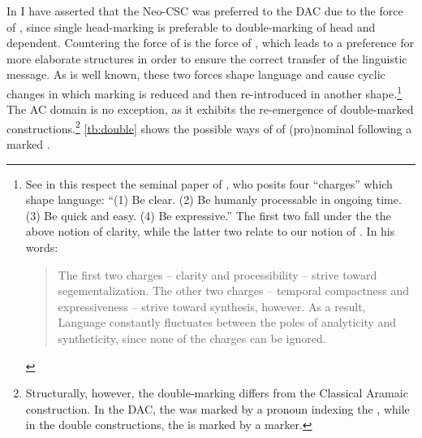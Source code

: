 In  I have asserted that the Neo-CSC was preferred to the DAC due to the force of , since single head-marking is preferable to double-marking of head and dependent. Countering the force of  is the force of , which leads to a preference for more elaborate structures in order to ensure  the correct transfer of the linguistic message.
 As is well known, these two forces shape language and cause cyclic changes in which marking is reduced and then re-introduced in another shape.\footnote{See in this respect the seminal paper of \citet[186]{Slobin1977}, who posits four \enquote{charges} which shape language: \enquote{(1) Be clear. (2) Be humanly processable in ongoing time. (3) Be quick and easy. (4) Be expressive.} The first two fall under the the above notion of clarity, while the latter two relate to our notion of . In his words: \blockquote{The first two charges -- clarity and processibility -- strive toward segementalization. The other two charges -- temporal compactness and expressiveness -- strive toward synthesis, however. As a result, Language constantly fluctuates  between the poles of analyticity and syntheticity, since none of the charges can be ignored.} \citep[192]{Slobin1977}} The  AC domain is no exception, as it exhibits the re-emergence of double-marked constructions.\footnote{Structurally, however, the  double-marking differs from the Classical Aramaic construction. In the  DAC, the \prim was marked by a pronoun indexing the \secn, while in the  double constructions, the \prim is marked by a \cst* marker.} \ref{tb:double} shows the possible ways of  of (pro)nominal \secns following a \cst* marked \prim.

